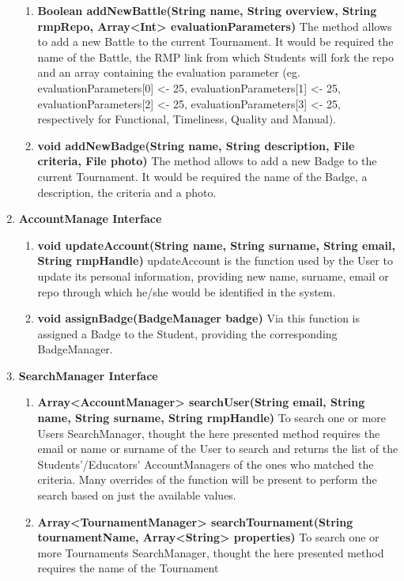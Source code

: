 \begin{enumerate}
\begin{enumerate}[label=$\bullet$]
        \item \textbf{Boolean addNewBattle(String name, String overview, String rmpRepo, Array<Int> evaluationParameters)} The method allows to add a new Battle to the current Tournament. It would be required the name of the Battle, 
        the RMP link from which Students will fork the repo and an array containing the evaluation parameter (eg. evaluationParameters[0] <- 25, evaluationParameters[1] <- 25, evaluationParameters[2] <- 25, evaluationParameters[3] <- 25,
        respectively for Functional, Timeliness, Quality and Manual).
        \item \textbf{void addNewBadge(String name, String description, File criteria, File photo)} The method allows to add a new Badge to the current Tournament. It would be required the name of the Badge, a description, the criteria 
        and a photo.
        \end{enumerate}
    \item \textbf{AccountManage Interface} 
        \begin{enumerate}[label=$\bullet$]
            \item \textbf{void updateAccount(String name, String surname, String email, String rmpHandle)} updateAccount is the function used by the User to update its personal information, providing new name, surname, email or repo 
            through which he/she would be identified in the system.
            \item \textbf{void assignBadge(BadgeManager badge)} Via this function is assigned a Badge to the Student, providing the corresponding BadgeManager.
        \end{enumerate}
    \item \textbf{SearchManager Interface} 
        \begin{enumerate}[label=$\bullet$]
            \item \textbf{Array<AccountManager> searchUser(String email, String name, String surname, String rmpHandle)} To search one or more Users SearchManager, thought the here presented method requires the email or name or surname
            of the User to search and returns the list of the Students'/Educators' AccountManagers of the ones who matched the criteria. Many overrides of the function will be present to perform the search based on just the available values.
            \item \textbf{Array<TournamentManager> searchTournament(String tournamentName, Array<String> properties)} To search one or more Tournaments SearchManager, thought the here presented method requires the name of the Tournament 

\end{enumerate}
\end{enumerate}
